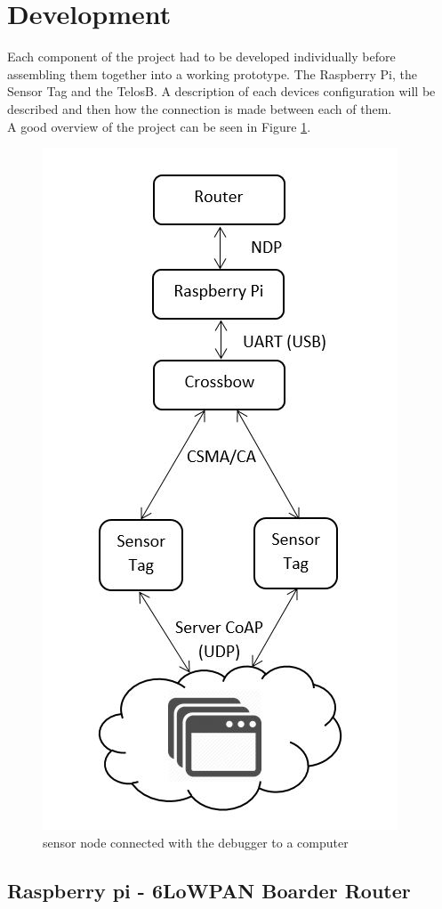 \section{Development}

Each component of the project had to be developed individually before assembling them together into a working prototype. The Raspberry Pi, the Sensor Tag and the TelosB. A description of each devices configuration will be described and then how the connection is made between each of them.\\

A good overview of the project can be seen in Figure \ref{fig:over}.

\begin{figure}[!h]
	\begin{center}
		\includegraphics[width=0.6\linewidth]{protocol}
		\caption{sensor node connected with the debugger to a computer}
		\label{fig:over}
	\end{center}
	
\end{figure} 

\subsection{Raspberry pi - 6LoWPAN Boarder Router}

